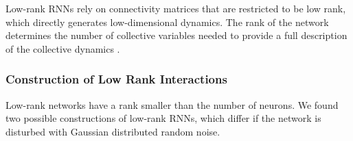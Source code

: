 \documentclass[11pt]{article}
\begin{document}
	Low-rank RNNs rely on connectivity matrices that are restricted to be low rank, which directly generates low-dimensional dynamics. The rank of the network determines the number of collective variables needed to provide a full description of the collective dynamics \cite{beiran2021shaping}. 
	
	\subsubsection{Construction of Low Rank Interactions} \label{sec:low_rank_construct}
	Low-rank networks have a rank smaller than the number of neurons. We found two possible constructions of low-rank RNNs, which differ if the network is disturbed with Gaussian distributed random noise. 
	
\end{document}
